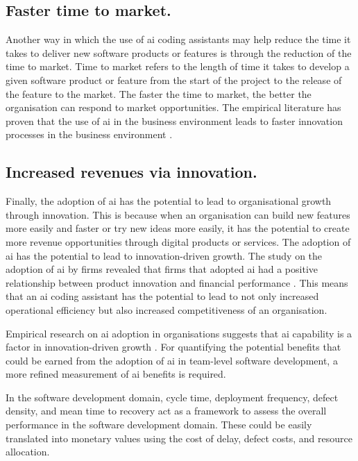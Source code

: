 \subsection {Faster time to market.}
\label{sec:Faster time to market}
Another way in which the use of \gls{ai} coding assistants may help reduce the time it takes to deliver new software products or features is through the reduction of the time to market. Time to market refers to the length of time it takes to develop a given software product or feature from the start of the project to the release of the feature to the market. The faster the time to market, the better the organisation can respond to market opportunities. The empirical literature has proven that the use of \gls{ai} in the business environment leads to faster innovation processes in the business environment \autocite{Babina2024}.

\subsection {Increased revenues via innovation.}
\label{sec:Increased revenues via innovation}
Finally, the adoption of \gls{ai} has the potential to lead to organisational growth through innovation. This is because when an organisation can build new features more easily and faster or try new ideas more easily, it has the potential to create more revenue opportunities through digital products or services. The adoption of \gls{ai} has the potential to lead to innovation-driven growth. The study on the adoption of \gls{ai} by firms revealed that firms that adopted \gls{ai} had a positive relationship between product innovation and financial performance \autocite{Babina2024}. This means that an \gls{ai} coding assistant has the potential to lead to not only increased operational efficiency but also increased competitiveness of an organisation.

Empirical research on \gls{ai} adoption in organisations suggests that \gls{ai} capability is a factor in innovation-driven growth \autocite{Babina2024}. For quantifying the potential benefits that could be earned from the adoption of \gls{ai} in team-level software development, a more refined measurement of \gls{ai} benefits is required. 

In the software development domain, cycle time, deployment frequency, defect density, and mean time to recovery act as a framework to assess the overall performance in the software development domain. These could be easily translated into monetary values using the cost of delay, defect costs, and resource allocation. 

